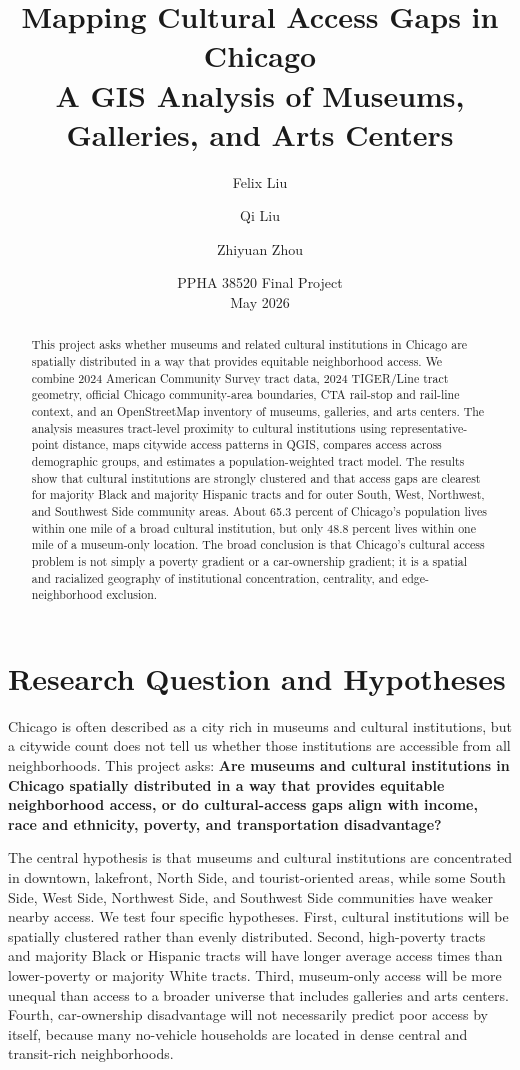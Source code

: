 \documentclass[11pt]{article}
\title{\textbf{Mapping Cultural Access Gaps in Chicago}\\
\large A GIS Analysis of Museums, Galleries, and Arts Centers}
\author{Felix Liu \and Qi Liu \and Zhiyuan Zhou}
\date{PPHA 38520 Final Project\\May 2026}
\begin{document}
\maketitle

\begin{abstract}
This project asks whether museums and related cultural institutions in Chicago are spatially distributed in a way that provides equitable neighborhood access. We combine 2024 American Community Survey tract data, 2024 TIGER/Line tract geometry, official Chicago community-area boundaries, CTA rail-stop and rail-line context, and an OpenStreetMap inventory of museums, galleries, and arts centers. The analysis measures tract-level proximity to cultural institutions using representative-point distance, maps citywide access patterns in QGIS, compares access across demographic groups, and estimates a population-weighted tract model. The results show that cultural institutions are strongly clustered and that access gaps are clearest for majority Black and majority Hispanic tracts and for outer South, West, Northwest, and Southwest Side community areas. About 65.3 percent of Chicago's population lives within one mile of a broad cultural institution, but only 48.8 percent lives within one mile of a museum-only location. The broad conclusion is that Chicago's cultural access problem is not simply a poverty gradient or a car-ownership gradient; it is a spatial and racialized geography of institutional concentration, centrality, and edge-neighborhood exclusion.
\end{abstract}

\section{Research Question and Hypotheses}

Chicago is often described as a city rich in museums and cultural institutions, but a citywide count does not tell us whether those institutions are accessible from all neighborhoods. This project asks: \textbf{Are museums and cultural institutions in Chicago spatially distributed in a way that provides equitable neighborhood access, or do cultural-access gaps align with income, race and ethnicity, poverty, and transportation disadvantage?}

The central hypothesis is that museums and cultural institutions are concentrated in downtown, lakefront, North Side, and tourist-oriented areas, while some South Side, West Side, Northwest Side, and Southwest Side communities have weaker nearby access. We test four specific hypotheses. First, cultural institutions will be spatially clustered rather than evenly distributed. Second, high-poverty tracts and majority Black or Hispanic tracts will have longer average access times than lower-poverty or majority White tracts. Third, museum-only access will be more unequal than access to a broader universe that includes galleries and arts centers. Fourth, car-ownership disadvantage will not necessarily predict poor access by itself, because many no-vehicle households are located in dense central and transit-rich neighborhoods.
\end{document}
